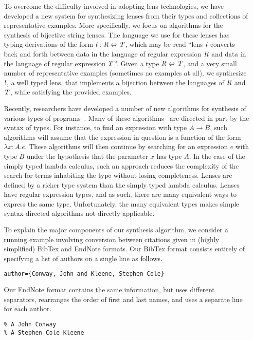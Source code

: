 \documentclass[numbers,10pt,preprint\ifanon ,nocopyrightspace\fi]{sigplanconf}
\begin{document}
To overcome the difficulty involved in adopting lens technologies, we have
developed a new system for synthesizing lenses
from their types and collections of representative examples.  More
specifically, we focus on algorithms for the synthesis of bijective
string lenses.  The language we use for these lenses has typing derivations of
the form $\mathit{l} : \mathit{R} \Leftrightarrow \mathit{T}$, which may be read
``lens $\mathit{l}$ converts back and forth between
data in the language of regular expression $\mathit{R}$ and data in the language
of regular expression $\mathit{T}$''.
Given a type $\mathit{R} \Leftrightarrow \mathit{T}$, and a very small number of
representative examples (sometimes
no examples at all), we synthesize $\mathit{l}$, a well typed lens, that implements
a bijection between the languages of $\mathit{R}$ and $\mathit{T}$, while satisfying
the provided examples.

Recently, researchers have developed a number of new algorithms for
synthesis of various types of
programs~\cite{yag+:pldi16,osera+:pldi15,frankle+:popl16,armando+:pldi16}.
Many of these
algorithms~\cite{osera+:pldi15,frankle+:popl16,armando+:pldi16} are
directed in part by the syntax of types.  For instance, to find an
expression with type $A \rightarrow B$, such algorithms will assume
that the expression in question is a function of the form $\lambda
x{:}A. e$.  These algorithms will then continue by searching for an
expression $e$
with type $B$ under the hypothesis that the parameter $x$ has type
$A$.  In the case of the simply typed lambda calculus, such an
approach reduces the complexity of the search for terms inhabiting the
type without losing completeness.  Lenses are defined by a richer type system
than the simply typed lambda calculus.
Lenses have regular expression types, and as such,
there are many equivalent ways to express the same type.
Unfortunately, the many equivalent types makes simple
syntax-directed algorithms not directly applicable.

To explain the major components of our synthesis algorithm,
we consider a running example involving conversion between citations given
in (highly simplified) BibTex and EndNote formats.  Our BibTex format
consists entirely of specifying a list of authors on a single line as follows.
\begin{lstlisting}
author={Conway, John and Kleene, Stephen Cole}
\end{lstlisting}
Our EndNote format contains the same information, but uses different separators,
rearranges the order of first and last names, and uses a separate line for each
author. 
\begin{lstlisting}
% A John Conway
% A Stephen Cole Kleene
\end{lstlisting}
\end{document}
